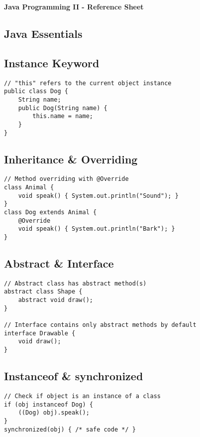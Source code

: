 \documentclass[10pt]{article}
\begin{document}
\begin{center}
    \Large \textbf{Java Programming II - Reference Sheet} \\
\end{center}

\vspace{0.2cm}
\begin{multicols}{2}

\section*{Java Essentials}

\subsection*{Instance Keyword}
\begin{lstlisting}
// "this" refers to the current object instance
public class Dog {
    String name;
    public Dog(String name) {
        this.name = name;
    }
}
\end{lstlisting}

\subsection*{Inheritance \& Overriding}
\begin{lstlisting}
// Method overriding with @Override
class Animal {
    void speak() { System.out.println("Sound"); }
}
class Dog extends Animal {
    @Override
    void speak() { System.out.println("Bark"); }
}
\end{lstlisting}

\subsection*{Abstract \& Interface}
\begin{lstlisting}
// Abstract class has abstract method(s)
abstract class Shape {
    abstract void draw();
}

// Interface contains only abstract methods by default
interface Drawable {
    void draw();
}
\end{lstlisting}

\subsection*{Instanceof \& synchronized}
\begin{lstlisting}
// Check if object is an instance of a class
if (obj instanceof Dog) {
    ((Dog) obj).speak();
}
synchronized(obj) { /* safe code */ }
\end{lstlisting}


\end{multicols}
\end{document}
